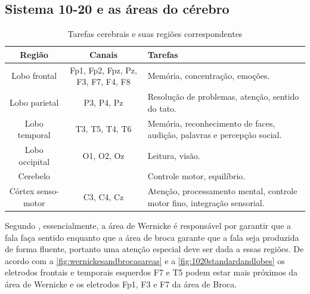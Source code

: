 			\subsection{Sistema 10-20 e as áreas do cérebro}
			\begin{table}[H]
				\begin{center}
					\caption{Tarefas cerebrais e suas regiões correspondentes}
					\begin{tabular}{|c|c|p{}|}
						\hline
						Região & Canais & Tarefas\\
						\hline
						Lobo frontal & Fp1, Fp2, Fpz, Pz, F3, F7, F4, F8 & Memória, concentração, emoções.\\
						\hline
						Lobo parietal & P3, P4, Pz & Resolução de problemas, atenção, sentido do tato. \\
						\hline
						Lobo temporal & T3, T5, T4, T6 & Memória, reconhecimento de faces, audição, palavras e percepção social. \\
						\hline
						Lobo occipital & O1, O2, Oz & Leitura, visão.\\
						\hline
						Cerebelo && Controle motor, equilíbrio. \\
						\hline
						Córtex senso-motor & C3, C4, Cz& Atenção, processamento mental, controle motor fino, integração sensorial. \\
						\hline
					\end{tabular}
					\label{tb:brainRegions}
				\end{center}
			\end{table}
		
			\par Segundo \cite{bioengineering10060649}, essencialmente, a área de Wernicke é responsável por garantir que a fala faça sentido enquanto que a área de broca garante que a fala seja produzida de forma fluente, portanto uma atenção especial deve ser dada a essas regiões. De acordo com a \autoref{fig:wernickesandbrocasareas} e a \autoref{fig:1020standardandlobes} os eletrodos frontais e temporais esquerdos F7 e T5 podem estar mais próximos da área de Wernicke e os eletrodos Fp1, F3 e F7 da área de Broca.
			
